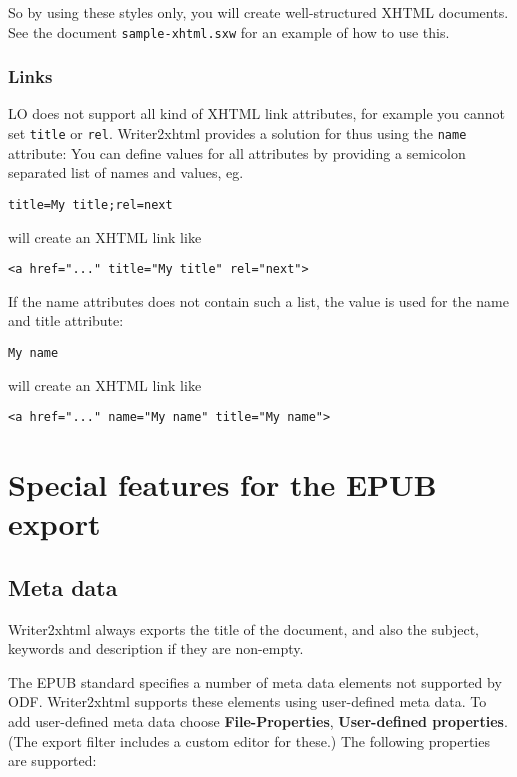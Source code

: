 \documentclass{article}
\newcommand\textstyleSourceText[1]{\texttt{\textmd{#1}}}
\begin{document}
{\mdseries
So by using these styles only, you will create well-structured XHTML documents. See the document \textstyleSourceText{sample-xhtml.sxw} for an example of how to use this.}

\subsubsection{Links}
{\mdseries
LO does not support all kind of XHTML link attributes, for example you cannot set \textstyleSourceText{title} or \textstyleSourceText{rel}. Writer2xhtml provides a solution for thus using the \textstyleSourceText{name} attribute: You can define values for all attributes by providing a semicolon separated list of names and values, eg.}

\begin{verbatim}
title=My title;rel=next
\end{verbatim}
{\mdseries
will create an XHTML link like}

\begin{verbatim}
<a href="..." title="My title" rel="next">
\end{verbatim}
{\mdseries
If the name attributes does not contain such a list, the value is used for the name and title attribute:}

\begin{verbatim}
My name
\end{verbatim}
{\mdseries
will create an XHTML link like}

\begin{verbatim}
<a href="..." name="My name" title="My name">
\end{verbatim}
\section{Special features for the EPUB export}
\subsection{Meta data}
{\mdseries
Writer2xhtml always exports the title of the document, and also the subject, keywords and description if they are non-empty.}

{\mdseries
The EPUB standard specifies a number of meta data elements not supported by ODF. Writer2xhtml supports these elements using user-defined meta data. To add user-defined meta data choose \textbf{File-Properties}, \textbf{User-defined properties}. (The export filter includes a custom editor for these.) The following properties are supported:}
\end{document}
